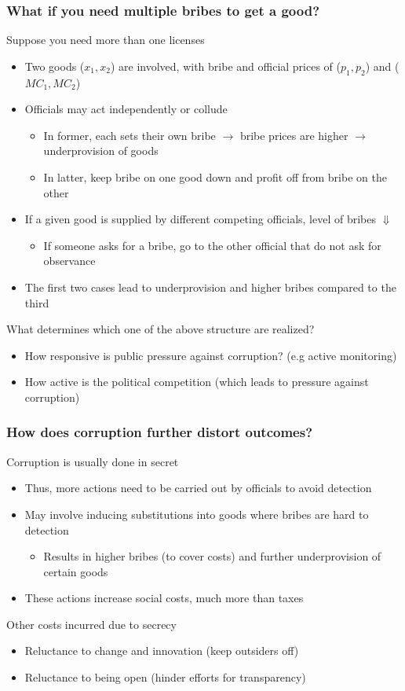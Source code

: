 \documentclass[aspectratio=169]{beamer}
\begin{document}
\begin{frame}
\frametitle{What if you need multiple bribes to get a good?} 
Suppose you need more than one licenses 
\begin{itemize}\setlength\itemsep{3pt}
\item Two goods ($x_1, x_2$) are involved, with bribe and official prices of ($p_1, p_2$) and ($MC_1, MC_2$)
\item Officials may act independently or collude
\begin{itemize}
\item In former, each sets their own bribe $\to$ bribe prices are higher $\to$ underprovision of goods
\item In latter, keep bribe on one good down and profit off from bribe on the other
\end{itemize}
\item If a given good is supplied by different competing officials, level of bribes $\Downarrow$
\begin{itemize}
\item If someone asks for a bribe, go to the other official that do not ask for observance
\end{itemize}
\item The first two cases lead to underprovision and higher bribes compared to the third
\end{itemize}\medskip
What determines which one of the above structure are realized?
\begin{itemize}\setlength\itemsep{3pt}
\item How responsive is public pressure against corruption? (e.g active monitoring)
\item How active is the political competition (which leads to pressure against corruption)
\end{itemize}
\end{frame}

\begin{frame}
\frametitle{How does corruption further distort outcomes?} 
 Corruption is usually done in secret
\begin{itemize}\setlength\itemsep{3pt}
\item Thus, more actions need to be carried out by officials to avoid detection
\item May involve inducing substitutions into goods where bribes are hard to detection
\begin{itemize}
\item Results in higher bribes (to cover costs) and further underprovision of certain goods
\end{itemize}
\item These actions increase social costs,  much more than taxes
\end{itemize}\medskip
Other costs incurred due to secrecy
\begin{itemize}\setlength\itemsep{3pt}
\item Reluctance to change and innovation (keep outsiders off)
\item Reluctance to being open (hinder efforts for transparency)
\end{itemize}
\end{frame}
\end{document}
